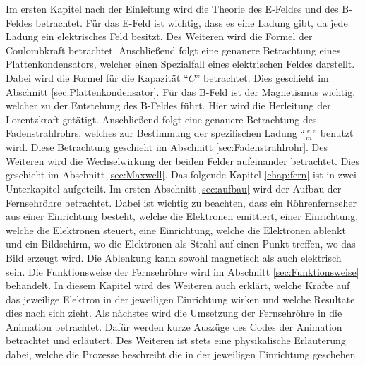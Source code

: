 Im ersten Kapitel nach der Einleitung wird die Theorie des E-Feldes und des B-Feldes betrachtet.
Für das E-Feld ist wichtig, dass es eine Ladung gibt, da jede Ladung ein elektrisches Feld besitzt.
Des Weiteren wird die Formel der Coulombkraft betrachtet.
Anschließend folgt eine genauere Betrachtung eines Plattenkondensators, welcher einen Spezialfall eines elektrischen Feldes darstellt.
Dabei wird die Formel für die Kapazität "`$C$"' betrachtet.
Dies geschieht im Abschnitt \ref{sec:Plattenkondensator}.
Für das B-Feld ist der Magnetismus wichtig, welcher zu der Entstehung des B-Feldes führt.
Hier wird die Herleitung der Lorentzkraft getätigt.
Anschließend folgt eine genauere Betrachtung des Fadenstrahlrohrs, welches zur Bestimmung der spezifischen Ladung "`$\frac{e}{m}$"' benutzt wird.
Diese Betrachtung geschieht im Abschnitt \ref{sec:Fadenstrahlrohr}.
Des Weiteren wird die Wechselwirkung der beiden Felder aufeinander betrachtet.
Dies geschieht im Abschnitt \ref{sec:Maxwell}.
Das folgende Kapitel \ref{chap:fern} ist in zwei Unterkapitel aufgeteilt.
Im ersten Abschnitt \ref{sec:aufbau} wird der Aufbau der Fernsehröhre betrachtet.
Dabei ist wichtig zu beachten, dass ein Röhrenfernseher aus einer Einrichtung besteht, welche die Elektronen emittiert, einer Einrichtung, welche die Elektronen steuert, eine Einrichtung, welche die Elektronen ablenkt und ein Bildschirm, wo die Elektronen als Strahl auf einen Punkt treffen, wo das Bild erzeugt wird.
Die Ablenkung kann sowohl magnetisch als auch elektrisch sein.
Die Funktionsweise der Fernsehröhre wird im Abschnitt \ref{sec:Funktionsweise} behandelt.
In diesem Kapitel wird des Weiteren auch erklärt, welche Kräfte auf das jeweilige Elektron in der jeweiligen Einrichtung wirken und welche Resultate dies nach sich zieht.
Als nächstes wird die Umsetzung der Fernsehröhre in die Animation betrachtet.
Dafür werden kurze Auszüge des Codes der Animation betrachtet und erläutert.
Des Weiteren ist stets eine physikalische Erläuterung dabei, welche die Prozesse beschreibt die in der jeweiligen Einrichtung geschehen.

